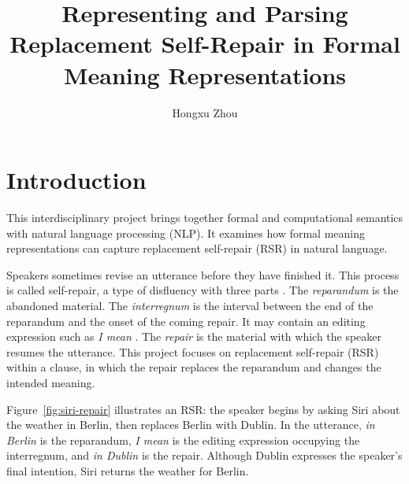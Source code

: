 \documentclass{article}
\title{\vspace{-2.5em}Representing and Parsing Replacement Self-Repair in Formal Meaning Representations}
\author{Hongxu Zhou}
\date{}
\begin{document}
\pagestyle{fancy}
\fancyhf{}
\fancyfoot[C]{\thepage/\pageref{LastPage}}
\renewcommand{\headrulewidth}{0pt}
\maketitle
\thispagestyle{fancy}


\hypersetup{
    colorlinks=true,
    linkcolor=black,
    citecolor=black,
    urlcolor=blue
}


\newcommand{\sbnterm}[1]{\texttt{#1}}

\section{Introduction}
\label{sec:introduction}
This interdisciplinary project brings together formal and computational semantics with natural language processing (NLP). It examines how formal meaning representations can capture replacement self-repair (RSR) in natural language.

Speakers sometimes revise an utterance before they have finished it. This
process is called self-repair, a type of disfluency with three parts
\citep{shribergPreliminariesTheorySpeech1994,
leveltMonitoringSelfrepairSpeech1983}. The \emph{reparandum} is the abandoned
material. The \emph{interregnum} is the interval between the end of the reparandum and the onset of the coming repair. It may contain an editing
expression such as \textit{I mean} \citep{clarkPausesHesitationsPsycholinguistic2006}.
The \emph{repair} is the material with which the speaker resumes the utterance.
This project focuses on replacement self-repair (RSR) within a clause, in which the
repair replaces the reparandum and changes the intended meaning.

Figure~\ref{fig:siri-repair} illustrates an RSR: 
the speaker begins by asking Siri about the weather in Berlin, then replaces
Berlin with Dublin. In the utterance, \textit{in Berlin} is the reparandum,
\textit{I mean} is the editing expression occupying the interregnum, and
\textit{in Dublin} is the repair. Although
Dublin expresses the speaker's final intention, Siri returns the weather for
Berlin.
\end{document}
